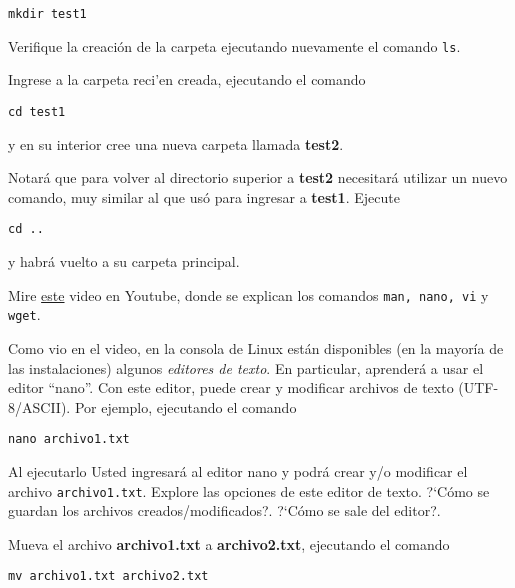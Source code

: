 \documentclass[11pt]{exam}
\begin{document}
\begin{questions}
\begin{parts}
\begin{verbatim}
mkdir test1
\end{verbatim}

Verifique la creación de la carpeta ejecutando nuevamente el comando \texttt{ls}.

\item Ingrese a la carpeta reci'en creada, ejecutando el comando 

\begin{verbatim}
cd test1
\end{verbatim}

y en su interior cree una nueva carpeta llamada \textbf{test2}.

\item Notará que para volver al directorio superior a \textbf{test2} necesitará utilizar un nuevo comando, muy similar al que usó para ingresar a \textbf{test1}. Ejecute

\begin{verbatim}
cd ..
\end{verbatim}

y habrá vuelto a su carpeta principal.

\item Mire \href{https://www.youtube.com/watch?v=4Cz8E71PYd4}{este} video en Youtube, donde se explican los comandos \texttt{man, nano, vi} y \texttt{wget}.

\item Como vio en el video, en la consola de Linux están disponibles (en la mayoría de las instalaciones) algunos \textit{editores de texto}. En particular, aprenderá a usar el editor ``nano''. Con este editor, puede crear y modificar archivos de texto (UTF-8/ASCII). Por ejemplo, ejecutando el comando 

\begin{verbatim}
nano archivo1.txt
\end{verbatim}

Al ejecutarlo Usted ingresará al editor nano y podrá crear y/o modificar el archivo \texttt{archivo1.txt}.
 Explore las opciones de este editor de texto. ?`Cómo se guardan los archivos creados/modi\-fi\-ca\-dos?. ?`Cómo se sale del editor?.

\item Mueva el archivo \textbf{archivo1.txt} a \textbf{archivo2.txt}, ejecutando el comando

\begin{verbatim}
mv archivo1.txt archivo2.txt
\end{verbatim}


\end{parts}
\end{questions}
\end{document}
